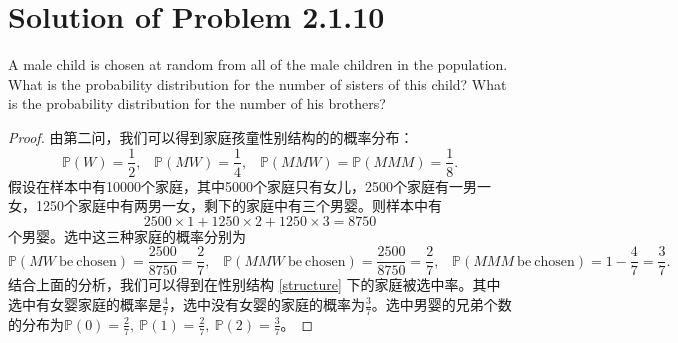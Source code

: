\documentclass[reqno,a4paper,14pt]{amsart}
\newcommand\Pro{\mathbb{P}}
\begin{document}
\section{Solution of Problem 2.1.10}
A male child is chosen at random from all of the male children in the population. What is the probability distribution for the number of sisters of this child? What is the probability distribution for the number of his brothers?
\begin{proof}
    由第二问，我们可以得到家庭孩童性别结构的的概率分布：
    \begin{equation}
        \Pro(W)=\frac{1}{2},\;\;\; \Pro(MW)=\frac{1}{4},\;\;\;\Pro(MMW)=\Pro(MMM)=\frac{1}{8}.
        \label{structure}
    \end{equation}
    假设在样本中有10000个家庭，其中5000个家庭只有女儿，2500个家庭有一男一女，1250个家庭中有两男一女，剩下的家庭中有三个男婴。则样本中有
    \begin{equation*}
        2500\times 1+1250\times 2+1250\times 3=8750
    \end{equation*}
    个男婴。选中这三种家庭的概率分别为
    \begin{equation*}
        \Pro(MW \mathrm{\ be \ chosen})=\frac{2500}{8750}=\frac{2}{7},\;\;\;\Pro(MMW \mathrm{\ be \ chosen})=\frac{2500}{8750}=\frac{2}{7},\;\;\;\Pro(MMM \mathrm{\ be \ chosen})=1-\frac{4}{7}=\frac{3}{7}.
    \end{equation*}
    结合上面的分析，我们可以得到在性别结构 \eqref{structure} 下的家庭被选中率。其中选中有女婴家庭的概率是$\frac{4}{7}$，选中没有女婴的家庭的概率为$\frac{3}{7}$。选中男婴的兄弟个数的分布为$\Pro(0)=\frac{2}{7},\ \Pro(1)=\frac{2}{7},\ \Pro(2)=\frac{3}{7}$。
\end{proof}
\end{document}
